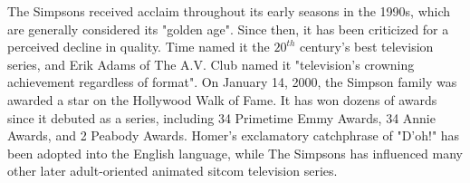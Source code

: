 The Simpsons received acclaim throughout its early seasons in the 1990s, which are generally considered its "golden age". Since then, it has been criticized for a perceived decline in quality. Time named it the $20^{th}$ century's best television series, and Erik Adams of The A.V. Club named it "television's crowning achievement regardless of format". On January 14, 2000, the Simpson family was awarded a star on the Hollywood Walk of Fame. It has won dozens of awards since it debuted as a series, including 34 Primetime Emmy Awards, 34 Annie Awards, and 2 Peabody Awards. Homer's exclamatory catchphrase of "D'oh!" has been adopted into the English language, while The Simpsons has influenced many other later adult-oriented animated sitcom television series.
\parencite{simpsons}